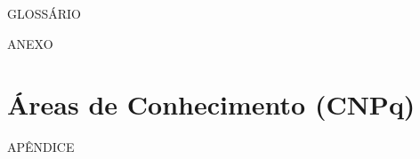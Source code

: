 \clearpage
\centering GLOSSÁRIO


\clearpage
\centering ANEXO
\section*{Áreas de Conhecimento (CNPq)}



\clearpage
\centering APÊNDICE
